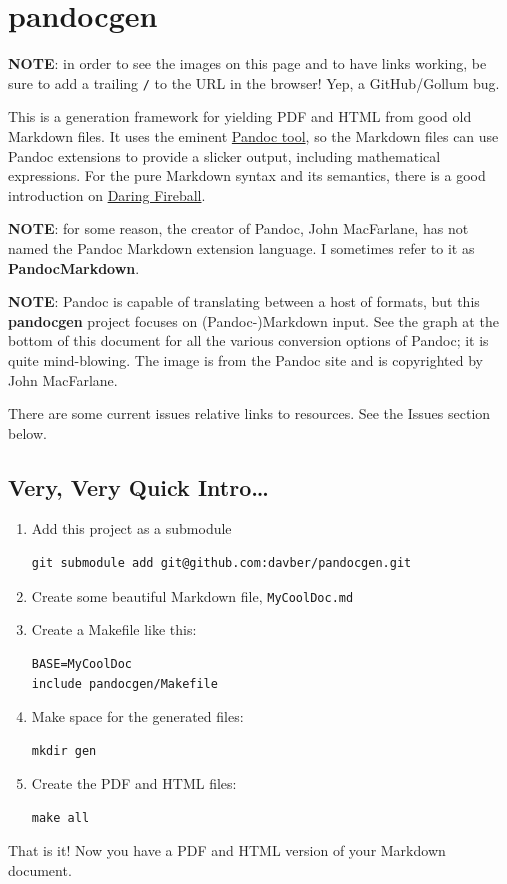 \documentclass[oneside,]{memoir}
\begin{document}
\chapter{pandocgen}

\textbf{NOTE}: in order to see the images on this page and to have links
working, be sure to add a trailing \texttt{/} to the URL in the browser!
Yep, a GitHub/Gollum bug.

This is a generation framework for yielding PDF and HTML from good old
Markdown files. It uses the eminent
\href{http://johnmacfarlane.net/pandoc/}{Pandoc tool}, so the Markdown
files can use Pandoc extensions to provide a slicker output, including
mathematical expressions. For the pure Markdown syntax and its
semantics, there is a good introduction on
\href{http://daringfireball.net/projects/markdown/syntax/}{Daring
Fireball}.

\textbf{NOTE}: for some reason, the creator of Pandoc, John MacFarlane,
has not named the Pandoc Markdown extension language. I sometimes refer
to it as \textbf{PandocMarkdown}.

\textbf{NOTE}: Pandoc is capable of translating between a host of
formats, but this \textbf{pandocgen} project focuses on
(Pandoc-)Markdown input. See the graph at the bottom of this document
for all the various conversion options of Pandoc; it is quite
mind-blowing. The image is from the Pandoc site and is copyrighted by
John MacFarlane.

There are some current issues relative links to resources. See the
Issues section below.

\section{Very, Very Quick Intro\ldots{}}

\begin{enumerate}[1.]
\item
  Add this project as a submodule

\begin{verbatim}
git submodule add git@github.com:davber/pandocgen.git
\end{verbatim}
\item
  Create some beautiful Markdown file, \texttt{MyCoolDoc.md}
\item
  Create a Makefile like this:

\begin{verbatim}
BASE=MyCoolDoc
include pandocgen/Makefile
\end{verbatim}
\item
  Make space for the generated files:

\begin{verbatim}
mkdir gen
\end{verbatim}
\item
  Create the PDF and HTML files:

\begin{verbatim}
make all
\end{verbatim}
\end{enumerate}
That is it! Now you have a PDF and HTML version of your Markdown
document.
\end{document}
